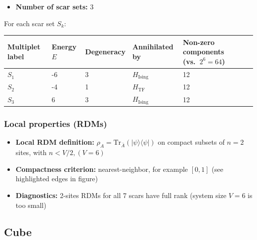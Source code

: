 \documentclass[11pt,a4paper]{article}
\newcommand{\Hising}{H_{\mathrm{Ising}}}
\newcommand{\Htf}{H_{\mathrm{TF}}}
\begin{document}
\begin{itemize}[leftmargin=1.5em]
  \item \textbf{Number of scar sets:} 3
  \end{itemize}
  \hspace{6mm}For each scar set $S_k$:\\

\begin{center}
\begin{tabular}{L{3.5cm} C{2.2cm} C{2.2cm} C{2.2cm} C{3.0cm} C{3.2cm}}
\toprule
\textbf{Multiplet label} & \textbf{Energy $E$} & \textbf{Degeneracy} & \textbf{Annihilated by} & \textbf{Non-zero components (vs.\ $2^{6} = 64$)} \\
\midrule
$S_1$ & -6 & 3  & $\Hising$ & 12 \\
\midrule
$S_2$ & -4 & 1 & $\Htf$ & 12 \\
\midrule
$S_3$ & 6 & 3 & $\Hising$ & 12 \\
\bottomrule
\end{tabular}
\end{center}

\subsubsection*{Local properties (RDMs)}

\begin{itemize}[leftmargin=1.5em]
  \item \textbf{Local RDM definition:} $\rho_A=\mathrm{Tr}_{\bar A}(|\psi\rangle\langle\psi|)$ on compact subsets of $n=2$ sites, with $n < V/2, (V=6)$
  \item \textbf{Compactness criterion:} nearest-neighbor, for example $[0,1]$ (see highlighted edges in figure)
   \item \textbf{Diagnostics:} 2-sites RDMs for all 7 scars have full rank (system size $V=6$ is too small)
\end{itemize}


\subsection*{Cube}
\end{document}
